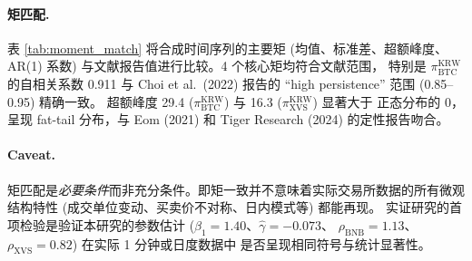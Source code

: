 \documentclass[11pt,a4paper]{article}
\begin{document}
\paragraph{矩匹配.}
表 \ref{tab:moment_match} 将合成时间序列的主要矩 (均值、标准差、超额峰度、AR(1) 系数)
与文献报告值进行比较。4 个核心矩均符合文献范围，
特别是 $\pi^{\text{KRW}}_{\text{BTC}}$ 的自相关系数 0.911 与 Choi et al.\ (2022) 报告的
``high persistence'' 范围 (0.85--0.95) 精确一致。
超额峰度 29.4 ($\pi^{\text{KRW}}_{\text{BTC}}$) 与 16.3 ($\pi^{\text{KRW}}_{\text{XVS}}$) 显著大于
正态分布的 0，呈现 fat-tail 分布，与 Eom (2021) 和 Tiger Research (2024) 的定性报告吻合。

\begin{table}[H]
\centering
\caption{矩匹配: 合成数据 vs 文献报告值。}
\label{tab:moment_match}
\small

\end{table}

\paragraph{Caveat.}
矩匹配是\emph{必要条件}而非充分条件。即矩一致并不意味着实际交易所数据的所有微观结构特性
(成交单位变动、买卖价不对称、日内模式等) 都能再现。
实证研究的首项检验是验证本研究的参数估计 ($\beta_1=1.40$、$\hat\gamma=-0.073$、
$\rho_{\text{BNB}}=1.13$、$\rho_{\text{XVS}}=0.82$) 在实际 1 分钟或日度数据中
是否呈现相同符号与统计显著性。
\end{document}
